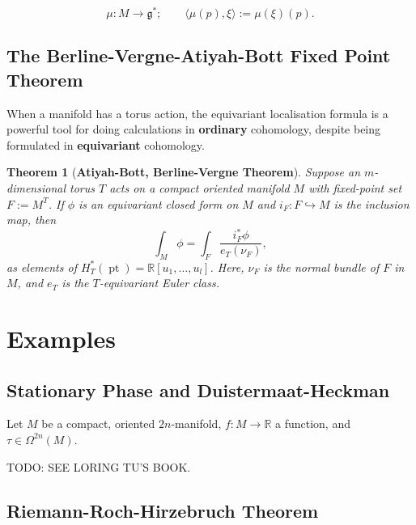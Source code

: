 \documentclass{article}
\newtheorem{theorem}{Theorem}[section]
\newcommand{\ra}{\rightarrow}
\newcommand{\lra}{\longrightarrow}
\newcommand{\W}{\Omega}
\newcommand{\RR}{\mathbb{R}}
\newcommand{\mfg}{\mathfrak{g}}
\DeclareMathOperator{\pt}{pt}
\begin{document}
	\begin{equation*}
		\mu : M \lra \mfg^{\ast}; \qquad \langle \mu(p), \xi \rangle := \mu(\xi)(p).
	\end{equation*}











\subsection{The Berline-Vergne-Atiyah-Bott Fixed Point Theorem}

When a manifold has a torus action, the equivariant localisation formula is a powerful tool for doing calculations in \textbf{ordinary} cohomology, despite being formulated in \textbf{equivariant} cohomology.

\begin{theorem}[\textbf{Atiyah-Bott, Berline-Vergne Theorem}]
	Suppose an $m$-dimensional torus $T$ acts on a compact oriented manifold $M$ with fixed-point set $F := M^{T}$. If $\phi$ is an equivariant closed form on $M$ and $i_{F}: F \hookrightarrow M$ is the inclusion map, then
	\begin{equation*}
		\int_{M} \phi = \int_{F} \frac{i_{F}^{\ast} \phi}{e_{T}(\nu_{F})},
	\end{equation*}
	as elements of $H_{T}^{\ast}(\pt) = \RR[u_{1}, \ldots, u_{l}]$. Here, $\nu_{F}$ is the normal bundle of $F$ in $M$, and $e_{T}$ is the $T$-equivariant Euler class.
\end{theorem}

\section{Examples}

\subsection{Stationary Phase and Duistermaat-Heckman}

Let $M$ be a compact, oriented $2n$-manifold, $f : M \ra \RR$ a function, and $\tau \in \W^{2n}(M)$.

TODO: SEE LORING TU'S BOOK.

\subsection{Riemann-Roch-Hirzebruch Theorem}
\end{document}
